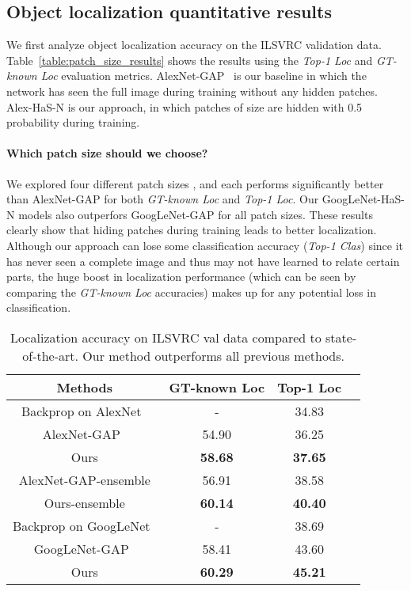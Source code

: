 \subsection{Object localization quantitative results}

We first analyze object localization accuracy on the ILSVRC validation data. Table~\ref{table:patch_size_results} shows the results using the \emph{Top-1 Loc} and \emph{GT-known Loc} evaluation metrics.  AlexNet-GAP~\cite{zhou-cvpr2016} is our baseline in which the network has seen the full image during training without any hidden patches. Alex-HaS-N is our approach, in which patches of size  are hidden with 0.5 probability during training.

\vspace{-10pt}
\paragraph{Which patch size  should we choose?} We explored four different patch sizes , and each performs significantly better than AlexNet-GAP for both \emph{GT-known Loc} and \emph{Top-1 Loc}. Our GoogLeNet-HaS-N models also outperfors GoogLeNet-GAP for all patch sizes.  These results clearly show that hiding patches during training leads to better localization. Although our approach can lose some classification accuracy (\emph{Top-1 Clas}) since it has never seen a complete image and thus may not have learned to relate certain parts, the huge boost in localization performance (which can be seen by comparing the \emph{GT-known Loc} accuracies) makes up for any potential loss in classification.


\begin{table}[t!]
\begin{center}
    \footnotesize
    \begin{tabular}{| c | c | c| c|}
    \hline    	
    Methods & GT-known Loc &  Top-1 Loc    \\
    \hline
    Backprop on AlexNet~\cite{simonyan-iclr2014} & - & 34.83 \\
    AlexNet-GAP~\cite{zhou-cvpr2016}  &  54.90 & 36.25\\
    
    Ours         & \textbf{58.68} & \textbf{37.65}  \\
    \hline
    AlexNet-GAP-ensemble   & 56.91 & 38.58 \\
    Ours-ensemble       & \textbf{60.14} & \textbf{40.40}   \\
            \hline
     Backprop on GoogLeNet~\cite{simonyan-iclr2014} & - & 38.69 \\
         GoogLeNet-GAP~\cite{zhou-cvpr2016} & 58.41 & 43.60 \\
         Ours         &  \textbf{60.29} & \textbf{45.21} \\
     \hline
    \end{tabular}
    \caption{Localization accuracy on ILSVRC val data compared to state-of-the-art.  Our method outperforms all previous methods.}
    \label{table:main_results}
\end{center}
\vspace*{-0.15in}
\end{table}



